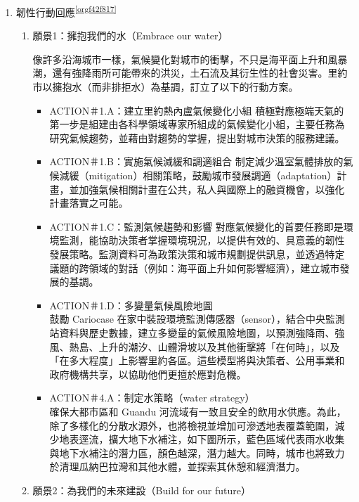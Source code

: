 \documentclass[a4paper,12pt]{article}
\begin{document}
\begin{enumerate}
\begin{enumerate}
\item 韌性行動回應\textsuperscript{\ref{orgf42f817}}
\label{sec:org37348ea}

\begin{enumerate}
\item 願景1：擁抱我們的水（Embrace our water）
\label{sec:org8a62f1f}

像許多沿海城市一樣，氣候變化對城市的衝擊，不只是海平面上升和風暴潮，還有強降雨所可能帶來的洪災，土石流及其衍生性的社會災害。里約市以擁抱水（而非排拒水）為基調，訂立了以下的行動方案。\\
\begin{itemize}
\item ACTION＃1.A：建立里約熱內盧氣候變化小組  積極對應極端天氣的第一步是組建由各科學領域專家所組成的氣候變化小組，主要任務為研究氣候趨勢，並藉由對趨勢的掌握，提出對城市決策的服務建議。\\
\item ACTION＃1.B：實施氣候減緩和調適組合  制定減少溫室氣體排放的氣候減緩（mitigation）相關策略，鼓勵城市發展調適（adaptation）計畫，並加強氣候相關計畫在公共，私人與國際上的融資機會，以強化計畫落實之可能。\\
\item ACTION＃1.C：監測氣候趨勢和影響  對應氣候變化的首要任務即是環境監測，能協助決策者掌握環境現況，以提供有效的、具意義的韌性發展策略。監測資料可為政策決策和城市規劃提供訊息，並透過特定議題的跨領域的對話（例如：海平面上升如何影響經濟），建立城市發展的基調。\\
\item ACTION＃1.D：多變量氣候風險地圖\\
鼓勵 Cariocase 在家中裝設環境監測傳感器（sensor），結合中央監測站資料與歷史數據，建立多變量的氣候風險地圖，以預測強降雨、強風、熱島、上升的潮汐、山體滑坡以及其他衝擊將「在何時」，以及「在多大程度」上影響里約各區。這些模型將與決策者、公用事業和政府機構共享，以協助他們更擅於應對危機。\\
\item ACTION＃4.A：制定水策略（water strategy）\\
確保大都市區和 Guandu 河流域有一致且安全的飲用水供應。為此，除了多樣化的分散水源外，也將檢視並增加可滲透地表覆蓋範圍，減少地表逕流，擴大地下水補注，如下圖所示，藍色區域代表雨水收集與地下水補注的潛力區，顏色越深，潛力越大。同時，城市也將致力於清理瓜納巴拉灣和其他水體，並探索其休憩和經濟潛力。\\
\end{itemize}
\item 願景2：為我們的未來建設（Build for our future）
\label{sec:orgf96ff49}


\end{enumerate}
\end{enumerate}
\end{enumerate}
\end{document}
